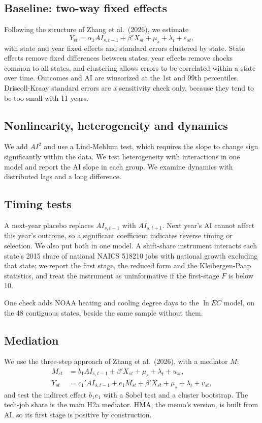 \subsection{Baseline: two-way fixed effects}
Following the structure of Zhang et al.\ (2026), we estimate
\begin{equation}
Y_{st} = \alpha_1 AI_{s,t-1} + \beta' X_{st} + \mu_s + \lambda_t + \varepsilon_{st},
\end{equation}
with state and year fixed effects and standard errors clustered by state. State effects remove fixed differences between states, year effects remove shocks common to all states, and clustering allows errors to be correlated within a state over time. Outcomes and AI are winsorized at the 1st and 99th percentiles. Driscoll-Kraay standard errors are a sensitivity check only, because they tend to be too small with 11 years.

\subsection{Nonlinearity, heterogeneity and dynamics}
We add $AI^2$ and use a Lind-Mehlum test, which requires the slope to change sign significantly within the data. We test heterogeneity with interactions in one model and report the AI slope in each group. We examine dynamics with distributed lags and a long difference.

\subsection{Timing tests}
A next-year placebo replaces $AI_{s,t-1}$ with $AI_{s,t+1}$. Next year's AI cannot affect this year's outcome, so a significant coefficient indicates reverse timing or selection. We also put both in one model. A shift-share instrument interacts each state's 2015 share of national NAICS 518210 jobs with national growth excluding that state; we report the first stage, the reduced form and the Kleibergen-Paap statistics, and treat the instrument as uninformative if the first-stage $F$ is below 10.

One check adds NOAA heating and cooling degree days to the $\ln EC$ model, on the 48 contiguous states, beside the same sample without them.

\subsection{Mediation}
We use the three-step approach of Zhang et al.\ (2026), with a mediator $M$:
\begin{align}
M_{st} &= b_1 AI_{s,t-1} + \beta' X_{st} + \mu_s + \lambda_t + u_{st}, \\
Y_{st} &= c_1' AI_{s,t-1} + e_1 M_{st} + \beta' X_{st} + \mu_s + \lambda_t + v_{st},
\end{align}
and test the indirect effect $b_1 e_1$ with a Sobel test and a cluster bootstrap. The tech-job share is the main H2a mediator. HMA, the memo's version, is built from AI, so its first stage is positive by construction.

